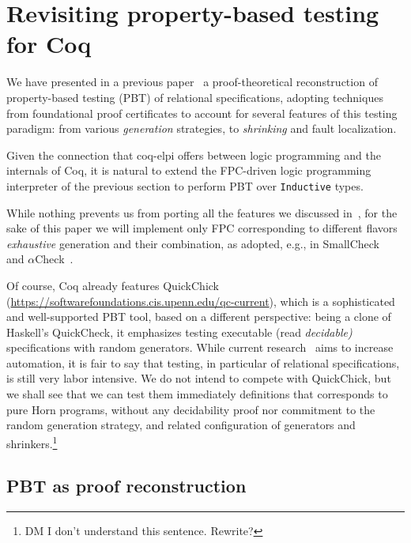 \section{Revisiting property-based testing for Coq}

We have presented in a previous paper~\cite{blanco19ppdp} a
proof-theoretical reconstruction of property-based testing (PBT) of
relational specifications, adopting techniques from foundational proof
certificates to account for several features of this testing
paradigm: from various \emph{generation} strategies, to
\emph{shrinking} and fault localization.

Given the connection that \textsf{coq-elpi} offers between logic
programming and the internals of Coq, it is natural to extend the
FPC-driven logic programming interpreter of the previous section to
perform PBT over \lstinline{Inductive} types.

While nothing prevents us from porting all the features we discussed
in~\cite{blanco19ppdp}, for the sake of this paper we will implement
only FPC corresponding to different flavors \emph{exhaustive}
generation and their combination, as adopted, e.g., in
SmallCheck~\cite{smallcheck} and
$\alpha$Check~\cite{cheney_momigliano_2017}.

Of course, Coq already features \textsf{QuickChick}~\cite{QChick}
(\url{https://softwarefoundations.cis.upenn.edu/qc-current}), which is a
sophisticated and well-supported PBT tool, based on a different
perspective: being a clone of Haskell's QuickCheck, it emphasizes
testing executable (read \emph{decidable)} specifications with random
generators. While current research~\cite{LampropoulosPP18} aims to
increase automation, it is fair to say that testing, in particular of
relational specifications, is still very labor intensive. We do not
intend to compete with \textsf{QuickChick}, but we shall see that we
can test them immediately  definitions that
corresponds to pure Horn programs, without any decidability proof nor
commitment to the random generation strategy, and related
configuration of generators and shrinkers.\footnote{DM I don't
  understand this sentence.  Rewrite?}


\subsection{PBT as proof reconstruction}
\label{ssec:pbt-lp}


